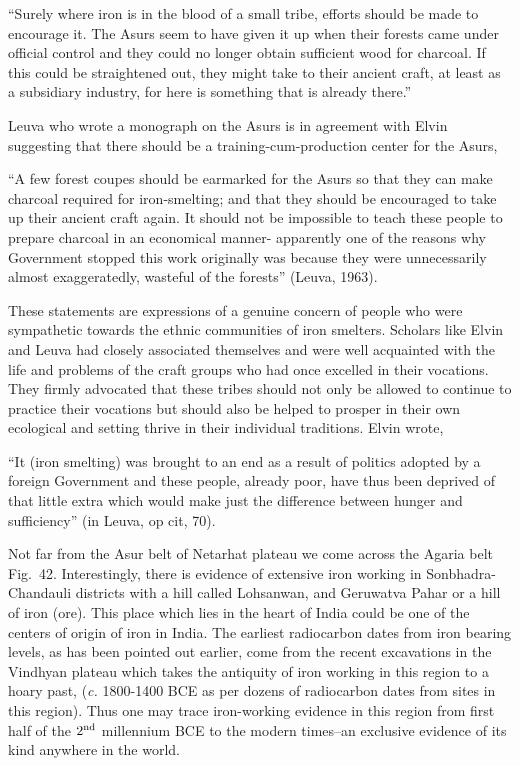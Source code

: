 \footnotesize{“Surely where iron is in the blood of a small tribe, efforts should be made to encourage it. The Asurs seem to have given it up when their forests came under official control and they could no longer obtain sufficient wood for charcoal. If this could be straightened out, they might take to their ancient craft, at least as a subsidiary industry, for here is something that is already there.”} 

Leuva who wrote a monograph on the Asurs is in agreement with Elvin suggesting that there should be a training-cum-production center for the Asurs, 

\footnotesize{“A few forest coupes should be earmarked for the Asurs so that they can make charcoal required for iron-smelting; and that they should be encouraged to take up their ancient craft again. It should not be impossible to teach these people to prepare charcoal in an economical manner- apparently one of the reasons why Government stopped this work originally was because they were unnecessarily almost exaggeratedly, wasteful of the forests”} (Leuva, 1963).

These statements are expressions of a genuine concern of people who were sympathetic towards the ethnic communities of iron smelters. Scholars like Elvin and Leuva had closely associated themselves and were well acquainted with the life and problems of the craft groups who had once excelled in their vocations. They firmly advocated that these tribes should not only be allowed to continue to practice their vocations but should also be helped to prosper in their own ecological and setting thrive in their individual traditions. Elvin wrote,

``It (iron smelting) was brought to an end as a result of politics adopted by a foreign Government and these people, already poor, have thus been deprived of that little extra which would make just the difference between hunger and sufficiency” (in Leuva, op cit, 70).

Not far from the Asur belt of Netarhat plateau we come across the Agaria belt Fig.~42. Interestingly, there is evidence of extensive iron working in Sonbhadra-Chandauli districts with a hill called Lohsanwan, and Geruwatva Pahar or a hill of iron (ore). This place which lies in the heart of India could be one of the centers of origin of iron in India. The earliest radiocarbon dates from iron bearing levels, as has been pointed out earlier, come from the recent excavations in the Vindhyan plateau which takes the antiquity of iron working in this region to a hoary past, ({\it c.} 1800-1400 BCE as per dozens of radiocarbon dates from sites in this region). Thus one may trace iron-working evidence in this region from first half of the $2^{\rm nd}$ millennium BCE to the modern times–an exclusive evidence of its kind anywhere in the world. 

